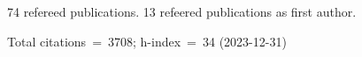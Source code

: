 74 refereed publications. 13 refeered publications as first author.

Total citations~=~3708; h-index~=~34 (2023-12-31)